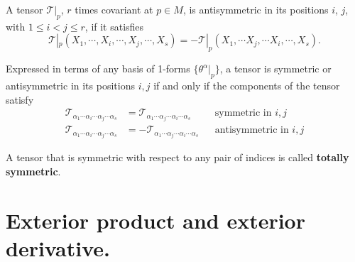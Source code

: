 \begin{points}
\item A tensor $\mathcal T|_p$, $r$ times covariant at $p\in M$, is antisymmetric in its positions $i$, $j$, with $1\leq i<j\leq r$, if it satisfies
\[
  \mathcal T|_p(X_1,\cdots,X_i,\cdots,X_j,\cdots,X_s)=-\mathcal T|_p(X_1,\cdots X_j,\cdots X_i,\cdots,X_s).
\]

\item Expressed in terms of any basis of 1-forms $\{\theta^\alpha|_p\}$, a tensor is symmetric or antisymmetric in its positions $i,j$ if and only if the components of the tensor satisfy
\begin{align*}
  \mathcal T_{\alpha_1\cdots\alpha_i\cdots\alpha_j\cdots\alpha_s}&=\mathcal T_{\alpha_1\cdots\alpha_j\cdots\alpha_i\cdots\alpha_s} &&\text{symmetric in }i,j\\
  \mathcal T_{\alpha_1\cdots\alpha_i\cdots\alpha_j\cdots\alpha_s}&=-\mathcal T_{\alpha_1\cdots\alpha_j\cdots\alpha_i\cdots\alpha_s} &&\text{antisymmetric in }i,j
\end{align*}

\item A tensor that is symmetric with respect to any pair of indices is called \textbf{totally symmetric}.
\end{points}

\section{Exterior product and exterior derivative.}

